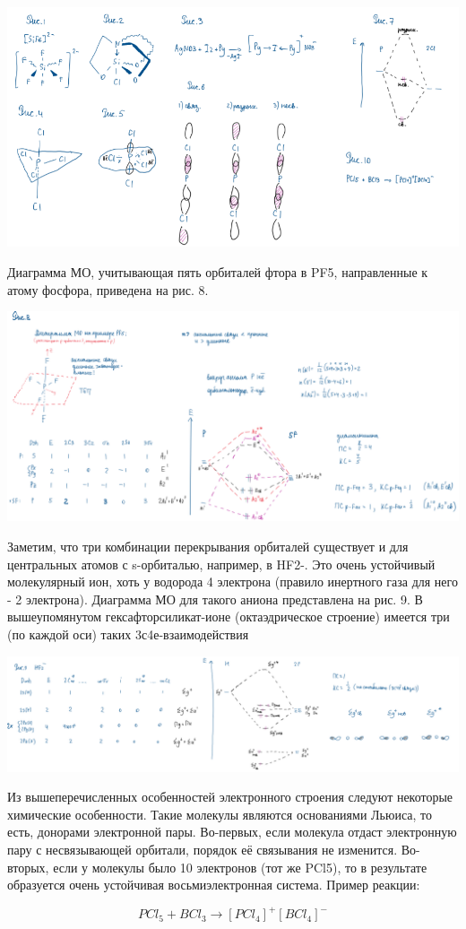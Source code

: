 \includegraphics{images/15v1.png}

Диаграмма МО, учитывающая пять орбиталей фтора в PF5, направленные к атому фосфора, приведена на рис. 8.

\includegraphics[scale=0.8]{images/15v2.png}


Заметим, что три комбинации перекрывания орбиталей существует и для центральных атомов с s-орбиталью, например, в HF2-. Это очень устойчивый молекулярный ион, хоть у водорода 4
электрона (правило инертного газа для него - 2 электрона). Диаграмма МО для такого аниона представлена на рис. 9. В вышеупомянутом гексафторсиликат-ионе (октаэдрическое строение)
имеется три (по каждой оси) таких 3с4е-взаимодействия

\includegraphics[scale=0.75]{images/15v3.png}

Из вышеперечисленных особенностей электронного строения следуют некоторые химические особенности. Такие молекулы являются основаниями Льюиса, то есть, донорами электронной
пары. Во-первых, если молекула отдаст электронную пару с несвязывающей орбитали, порядок её связывания не изменится. Во-вторых, если у молекулы было 10 электронов (тот же PCl5),
то в результате образуется очень устойчивая восьмиэлектронная система. Пример реакции:

$$PCl_5 + BCl_3 \rightarrow [PCl_4]^+[BCl_4]^-$$

